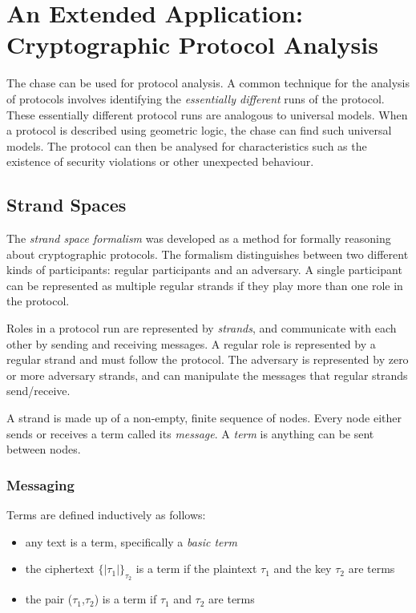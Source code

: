 \section{An Extended Application: \\ Cryptographic Protocol Analysis}

	The chase can be used for protocol analysis. A common technique for the
	analysis of protocols involves identifying the \emph{essentially different}
	runs of the protocol. These essentially different protocol runs are
	analogous to universal models. When a protocol is described using geometric
	logic, the chase can find such universal models. The protocol can then be
	analysed for characteristics such as the existence of security violations
	or other unexpected behaviour.

	\subsection{Strand Spaces}
	\label{sec:application.strand_spaces}

		The \emph{strand space formalism} was developed as a method for
		formally reasoning about cryptographic protocols. The formalism
		distinguishes between two different kinds of participants: regular
		participants and an adversary. A single participant can be represented
		as multiple regular strands if they play more than one role in the
		protocol.

		Roles in a protocol run are represented by \emph{strands}, and
		communicate with each other by sending and receiving messages. A
		regular role is represented by a regular strand and must follow the
		protocol. The adversary is represented by zero or more adversary
		strands, and can manipulate the messages that regular strands
		send/receive.

		A strand is made up of a non-empty, finite sequence of nodes. Every
		node either sends or receives a term called its \emph{message}. A
		\emph{term} is anything can be sent between nodes.

		\subsubsection{Messaging}

			Terms are defined inductively as follows:

			\begin{itemize}
			\item any text is a term, specifically a \emph{basic term}
			\item the ciphertext $\{|\tau_1|\}_{\tau_2}$ is a term if the plaintext $\tau_1$ and the key $\tau_2$ are terms
			\item the pair ($\tau_1$,$\tau_2$) is a term if $\tau_1$ and $\tau_2$ are terms
			\end{itemize}

